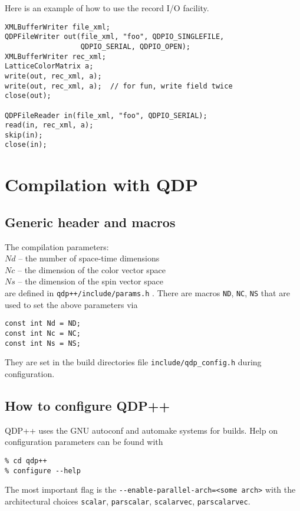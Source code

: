 \documentclass[12pt,letterpaper]{article}
\begin{document}
Here is an example of how to use the record I/O facility.
%
\begin{small}
\begin{verbatim}
XMLBufferWriter file_xml;
QDPFileWriter out(file_xml, "foo", QDPIO_SINGLEFILE, 
                  QDPIO_SERIAL, QDPIO_OPEN);
XMLBufferWriter rec_xml;
LatticeColorMatrix a;
write(out, rec_xml, a);
write(out, rec_xml, a);  // for fun, write field twice
close(out);

QDPFileReader in(file_xml, "foo", QDPIO_SERIAL);
read(in, rec_xml, a);
skip(in);
close(in);
\end{verbatim}
\end{small}


\newpage

\section{Compilation with QDP}

\subsection{Generic header and macros}

The compilation parameters:\\
\noindent
$Nd$ -- the number of space-time dimensions\\
\noindent
$Nc$ -- the dimension of the color vector space\\
\noindent
$Ns$ -- the dimension of the spin vector space\\
\noindent
are defined in {\tt qdp++/include/params.h} . 
There are macros {\tt ND}, {\tt NC},
{\tt NS} that are used to set the above parameters via
\begin{verbatim}
const int Nd = ND;
const int Nc = NC;
const int Ns = NS;
\end{verbatim}
%
\noindent
They are set in the build directories file {\tt include/qdp\_config.h} 
during configuration.

\subsection{How to configure QDP++}

QDP++ uses the GNU autoconf and automake systems for builds. Help on
configuration parameters can be found with
\begin{verbatim}
% cd qdp++
% configure --help
\end{verbatim}
%
The most important flag is the \verb|--enable-parallel-arch=<some arch>|
with the architectural choices \verb|scalar|, \verb|parscalar|, \verb|scalarvec|,
\verb|parscalarvec|.
\end{document}
